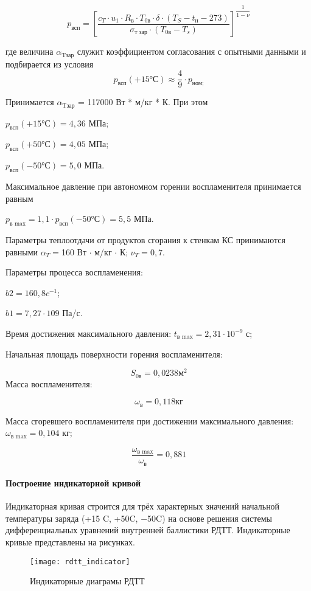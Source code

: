 $$ p_\text{всп} = \left[ \dfrac{ c_T \cdot u_1 \cdot R_\text{в} \cdot T_\text{0в} \cdot \delta \cdot (T_S - t_\text{н} -273 )} {\sigma _\text{т зар} \cdot (T_\text{0в} - T_s)} \right] ^{ \dfrac{1}{1-\nu}} $$

где величина $\alpha_\text{Tзар}$ служит коэффициентом согласования с опытными данными и подбирается из условия
$$p_\text{всп}(+15°С) \approx  \dfrac{4}{9} \cdot  p_\text{ном;}$$

 Принимается $\alpha_\text{Tзар} $ = 117000 Вт * м/кг * К. При этом

 $p_\text{всп}(+15°С) = 4,36$ МПа;

 $p_\text{всп}(+50°С) = 4,05$ МПа;

 $p_\text{всп}(-50°С) = 5,0 $ МПа.

 Максимальное давление при автономном горении воспламенителя принимается равным

 $p_\text{в max} = 1,1 \cdot  p_\text{всп}(-50°С) = 5,5 $ МПа.

 Параметры теплоотдачи от продуктов сгорания к стенкам КС принимаются равными $ \alpha_T = $160 Вт $\cdot$ м/кг $\cdot$ К; $\nu_T = 0,7$.

 Параметры процесса воспламенения:

 $b2 = 160,8 c^{-1}$;

 $b1 = 7, 27 \cdot 109 $ Па/с.

 Время достижения максимального давления:		$t_\text{в max} = 2,31 \cdot 10^{-9} $ с;

 Начальная площадь поверхности горения воспламенителя:

 									$$S_\text{0в} = 0,0238 \text{м}^2$$
 Масса воспламенителя:

 									$$\omega_\text{в} = 0,118 \text{кг}$$

 Масса сгоревшего воспламенителя при достижении максимального давления:									$\omega_\text{в max} = 0,104 $ кг;

 $$ \frac{ \omega_\text{в max}} {\omega _\text{в}} =0,881 $$

 \clearpage
 \paragraph{Построение индикаторной кривой}

Индикаторная кривая строится для трёх характерных значений начальной температуры заряда (+15 \textdegree C, +50\textdegree C, −50\textdegree C) на основе решения системы дифференциальных уравнений внутренней баллистики РДТТ. Индикаторные кривые представлены на рисунках.

\begin{figure}[h]
\begin{center}
    \texttt{[image: rdtt\_indicator]}
    \caption{Индикаторные диаграмы РДТТ}
    \label{fig:rdtt_indicator}
\end{center}
\end{figure}
